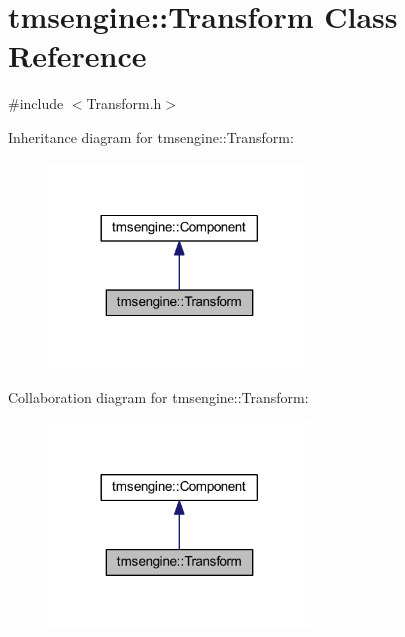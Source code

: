 \hypertarget{classtmsengine_1_1_transform}{}\section{tmsengine\+:\+:Transform Class Reference}
\label{classtmsengine_1_1_transform}


{\ttfamily \#include $<$Transform.\+h$>$}



Inheritance diagram for tmsengine\+:\+:Transform\+:\nopagebreak
\begin{figure}[H]
\begin{center}
\leavevmode
\includegraphics[width=197pt]{classtmsengine_1_1_transform__inherit__graph}
\end{center}
\end{figure}


Collaboration diagram for tmsengine\+:\+:Transform\+:\nopagebreak
\begin{figure}[H]
\begin{center}
\leavevmode
\includegraphics[width=197pt]{classtmsengine_1_1_transform__coll__graph}
\end{center}
\end{figure}
